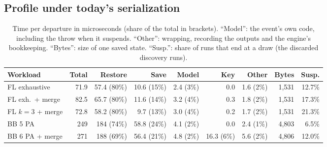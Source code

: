 \documentclass[11pt]{article}
\begin{document}
\subsection{Profile under today's serialization}
\begin{table}[ht]
\centering\footnotesize
\setlength{\tabcolsep}{4pt}
\begin{tabular*}{\linewidth}{@{\extracolsep{\fill}}l*{8}{r}@{}}
\toprule
\textbf{Workload} & \textbf{Total} & \textbf{Restore} & \textbf{Save} & \textbf{Model} & \textbf{Key} &
  \textbf{Other} & \textbf{Bytes} & \textbf{Susp.}\\
\midrule
FL exhaustive        & 71.9 & 57.4 (80\%) & 10.6 (15\%) & 2.4 (3\%) & 0.0 & 1.6 (2\%) & 1{,}531 & 12.7\%\\
FL exh.\ + merge     & 82.5 & 65.7 (80\%) & 11.6 (14\%) & 3.2 (4\%) & 0.3 & 1.8 (2\%) & 1{,}531 & 17.3\%\\
FL $k{=}3$ + merge   & 72.8 & 58.2 (80\%) &  9.7 (13\%) & 3.0 (4\%) & 0.2 & 1.7 (2\%) & 1{,}531 & 21.3\%\\
BB 5 PA              & 249  & 184 (74\%)  & 58.8 (24\%) & 4.1 (2\%) & 0.0 & 2.4 (1\%) & 4{,}803 &  6.5\%\\
BB 6 PA + merge      & 271  & 188 (69\%)  & 56.4 (21\%) & 4.8 (2\%) & 16.3 (6\%) & 5.6 (2\%) & 4{,}806 & 12.0\%\\
\bottomrule
\end{tabular*}
\caption{Time per departure in microseconds (share of the total in brackets). ``Model'': the event's own code,
including the throw when it suspends. ``Other'': wrapping, recording the outputs and the engine's bookkeeping.
``Bytes'': size of one saved state. ``Susp.'': share of runs that end at a draw (the discarded discovery runs).}
\label{tab:profile}
\end{table}
\end{document}

